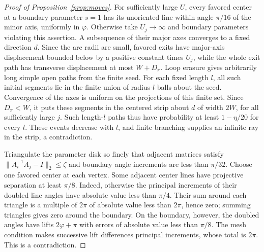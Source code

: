 \documentclass[11pt]{article}
\theoremstyle{definition}
\begin{document}
\begin{proof}[Proof of Proposition~\ref{prop:moves}]
For sufficiently large $U$, every favored center at a boundary
parameter $s=1$ has its unoriented line within angle $\pi/16$ of the
minor axis, uniformly in $\varphi$. Otherwise take $U_j\to\infty$
and boundary parameters violating this assertion. A subsequence of
their major axes converges to a fixed direction $d$. Since the arc
radii are small, favored exits have major-axis displacement bounded
below by a positive constant times $U_j$, while the whole exit path
has transverse displacement at most $W+D_\pi$. Loop erasure gives
arbitrarily long simple open paths from the finite seed. For each
fixed length $l$, all such initial segments lie in the finite union
of radius-$l$ balls about the seed. Convergence of the axes is uniform
on the projections of this finite set. Since $D_\pi<W$, it puts
these segments in the centered strip about $d$ of width $2W$, for
all sufficiently large $j$. Such length-$l$ paths thus have probability at least
$1-\eta/20$ for every $l$. These events decrease with $l$, and finite
branching supplies an infinite ray in the strip, a contradiction.

Triangulate the parameter disk so finely that adjacent matrices
satisfy $\|A_i^{-1}A_j-I\|_2\le\zeta$ and boundary angle increments
are less than $\pi/32$. Choose one favored center at each vertex.
Some adjacent center lines have projective separation at least
$\pi/8$. Indeed, otherwise the principal increments of their doubled
line angles have absolute value less than $\pi/4$. Their sum around
each triangle is a multiple of $2\pi$ of absolute value less than
$2\pi$, hence zero; summing triangles gives zero around the boundary.
On the boundary, however, the doubled angles have lifts
$2\varphi+\pi$ with errors of absolute value less than $\pi/8$.
The mesh condition makes successive lift differences principal
increments, whose total is $2\pi$. This is a contradiction.


\end{proof}
\end{document}

